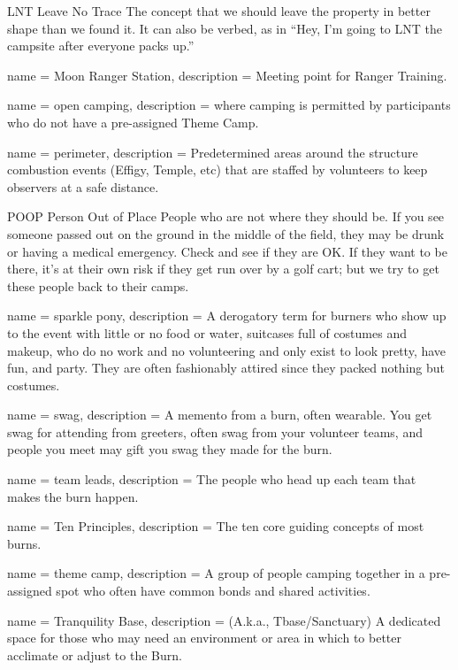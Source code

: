 {LNT}
{Leave No Trace}
{The concept that we should leave the property in better shape than we found it. It can also be verbed, as in ``Hey, I'm going to LNT the campsite after everyone packs up.'' }

 {
name = {Moon Ranger Station},
description = {Meeting point for Ranger Training.}
}

 {
name = {open camping},
description = {where camping is permitted by participants who do not have a pre-assigned Theme Camp.}
}

 {
name = {perimeter},
description = {Predetermined areas around the structure combustion events (Effigy, Temple, etc) that are staffed by volunteers to keep observers at a safe distance.}
}

{POOP}
{Person Out of Place}
{People who are not where they should be. If you see someone passed out on the ground in the middle of the field, they may be drunk or having a medical emergency. Check and see if they are OK. If they want to be there, it's at their own risk if they get run over by a golf cart; but we try to get these people back to their camps.}

 {
name = {sparkle pony},
description = {A derogatory term for burners who show up to the event with little or no food or water, suitcases full of costumes and makeup, who do no work and no volunteering and only exist to look pretty, have fun, and party. They are often fashionably attired since they packed nothing but costumes.}
}

 {
name = {swag},
description = {A memento from a burn, often wearable. You get swag for attending from \glspl{greeter}, often swag from your volunteer teams, and people you meet may gift you swag they made for the burn.}
}

 {
name = {team leads},
description = {The people who head up each team that makes the burn happen.}
}

 {
name = {Ten Principles},
description = {The ten core guiding concepts of most burns. }
}

 {
name = {theme camp},
description = {A group of people camping together in a pre-assigned spot who often have common bonds and shared activities.}
}

 {
name = {Tranquility Base},
description = {(A.k.a., Tbase/Sanctuary) A dedicated space for those who may need an environment or area in which to better acclimate or adjust to the Burn.}
}

